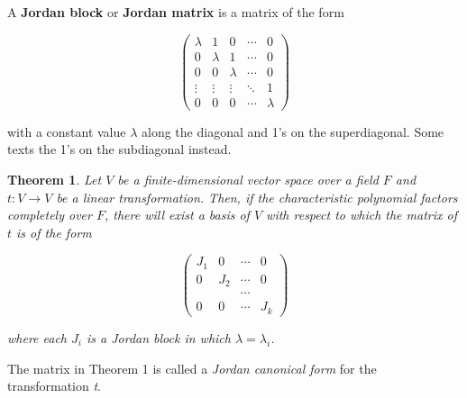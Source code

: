 \documentclass[12pt]{article}
\newtheorem*{thms}{Theorem}
\begin{document}
A \textbf{Jordan block} or \textbf{Jordan matrix} is a matrix of the form

$$\begin{pmatrix}
\lambda & 1 & 0 & \cdots & 0\\
0 & \lambda & 1 & \cdots & 0\\
0 & 0 & \lambda & \cdots & 0\\
\vdots & \vdots & \vdots &  \ddots & 1\\
0 & 0 & 0 & \cdots & \lambda
\end{pmatrix}$$

with a constant value $\lambda$ along the diagonal and 1's on the superdiagonal.  Some texts  the 1's on the subdiagonal instead.




\begin{thms} Let $V$ be a finite-dimensional vector space over a field $F$ and $t:V \to V$ be a linear transformation.  Then, if the characteristic polynomial factors completely over $F$, there will exist a basis of $V$ with respect to which the matrix of $t$ is of the form

$$\begin{pmatrix}
J_{1} & 0 & \cdots& 0\\
0 & J_{2} & \cdots & 0\\
 & & \cdots & \\
0 & 0 & \cdots & J_{k}
\end{pmatrix}$$

where each $J_{i}$ is a Jordan block in which $\lambda = \lambda_{i}$.
\end{thms}
The matrix in Theorem 1 is called a \emph{Jordan canonical form} for the transformation \emph{t}.


\end{document}
